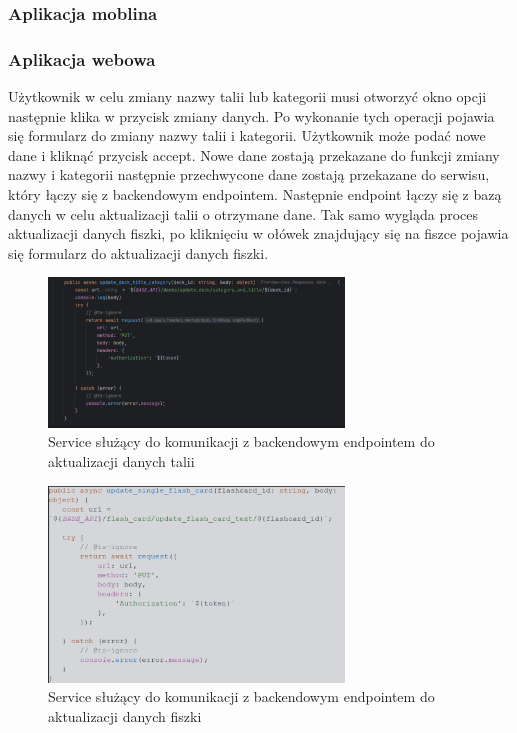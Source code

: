 \subsubsection{Aplikacja moblina}
\subsubsection{Aplikacja webowa}

Użytkownik w celu zmiany nazwy talii lub kategorii musi otworzyć okno opcji następnie klika w przycisk zmiany danych. Po wykonanie tych operacji pojawia się formularz do zmiany nazwy talii i kategorii. Użytkownik może podać nowe dane i kliknąć przycisk accept. Nowe dane zostają przekazane do funkcji zmiany nazwy i kategorii następnie przechwycone dane zostają przekazane do serwisu, który łączy się z backendowym endpointem. Następnie endpoint łączy się z bazą danych w celu aktualizacji talii o otrzymane dane. Tak samo wygląda proces aktualizacji danych fiszki, po kliknięciu w ołówek znajdujący się na fiszce pojawia się formularz do aktualizacji danych fiszki.

\begin{figure}[H]
    \centering
    \includegraphics[width=0.7\textwidth]{chapters/chapter_8/screens/update_deck_web}
    \caption{Service służący do komunikacji z backendowym endpointem do aktualizacji danych talii}
    \label{img:update_deck_web}
\end{figure}

\begin{figure}[H]
    \centering
    \includegraphics[width=0.7\textwidth]{chapters/chapter_8/screens/update_flash_card_text_web}
    \caption{Service służący do komunikacji z backendowym endpointem do aktualizacji danych fiszki}
    \label{img:update_flash_card_web}
\end{figure}

